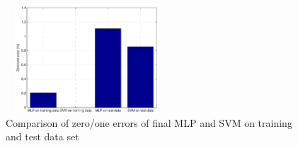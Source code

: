 \begin{figure}[htbp]
   \centering	
      \includegraphics[width=6cm, height=4cm]{figs/task4.pdf} 	
   \vspace{-0.3cm}
   \caption{Comparison of zero/one errors of final MLP and SVM on training and test data set}\label{fig:task4}
\end{figure}





